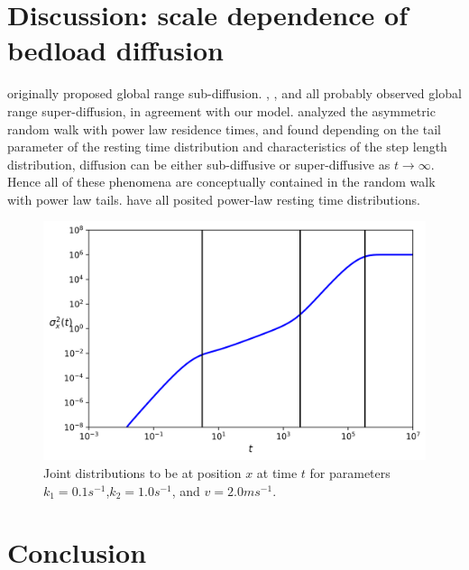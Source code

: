 \documentclass[]{agujournal2018}
\begin{document}
\section{Discussion: scale dependence of bedload diffusion}
\label{sec:discussion}

\citet{Nikora2002} originally proposed global range sub-diffusion.
\citet{Phillips2013}, \citet{Martin2012}, and \citet{Bradley2010} all probably observed global range super-diffusion, in agreement with our model.
\citet{Weeks1998} analyzed the asymmetric random walk with power law residence times, and found depending on the tail parameter of the resting time distribution and characteristics of the step length distribution, diffusion can be either sub-diffusive or super-diffusive as $t\rightarrow \infty$.
Hence all of these phenomena are conceptually contained in the random walk with power law tails.
\citet{Martin2012, Martin2014, Pierce2019, Bradley2017} have all posited power-law resting time distributions.



\begin{figure}[t]
	\includegraphics[width=\linewidth,keepaspectratio]{./figures/diffusion.png}
	\caption{Joint distributions to be at position $x$ at time $t$ for parameters $k_1=0.1s^{-1}$,$k_2=1.0s^{-1}$, and $v=2.0ms^{-1}$.}
	\label{fig:var}
\end{figure}

\section{Conclusion}


\appendix
\end{document}
